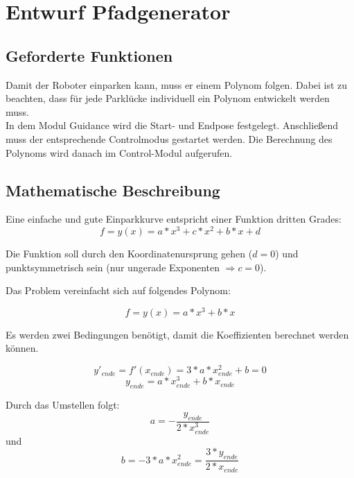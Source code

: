 \chapter{Entwurf Pfadgenerator}

\section{Geforderte Funktionen}

Damit der Roboter einparken kann, muss er einem Polynom folgen. Dabei ist zu beachten, dass für jede Parklücke individuell ein Polynom entwickelt werden muss.\\

\noindent In dem Modul Guidance wird die Start- und Endpose festgelegt. Anschließend muss der entsprechende Controlmodus gestartet werden. Die Berechnung des Polynoms wird danach im Control-Modul aufgerufen. 


\section{Mathematische Beschreibung}

Eine einfache und gute Einparkkurve entspricht einer Funktion dritten Grades:
\begin{equation}
f=y(x)=a*x^3+c*x^2+b*x+d
\end{equation}

\noindent Die Funktion soll durch den Koordinatenursprung gehen ($ d=0 $) und punktsymmetrisch sein (nur ungerade Exponenten $ \Rightarrow c=0 $). 

\noindent Das Problem vereinfacht sich auf folgendes Polynom:

\begin{equation}
f=y(x)=a*x^3+b*x
\end{equation}

\noindent Es werden zwei Bedingungen benötigt, damit die Koeffizienten berechnet werden können. 

\begin{equation}
 y'_{ende}=f'(x_{ende})=3*a*x_{ende}^2+b=0
 \end{equation}
 \begin{equation}
y_{ende}=a*x_{ende}^3+b*x_{ende}
 \end{equation}
 
\noindent Durch das Umstellen folgt:
 \begin{equation}
a=-\dfrac{y_{ende}}{2*x_{ende}^3}
\end{equation}
\noindent und
\begin{equation} 
b=-3*a*x_{ende}^2 = \dfrac{3*y_{ende}}{2*x_{ende}}
\end{equation}

